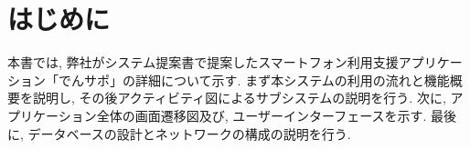 \section{はじめに}
本書では, 弊社がシステム提案書で提案したスマートフォン利用支援アプリケーション「でんサポ」の詳細について示す. まず本システムの利用の流れと機能概要を説明し, その後アクティビティ図によるサブシステムの説明を行う. 次に, アプリケーション全体の画面遷移図及び, ユーザーインターフェースを示す. 最後に, データベースの設計とネットワークの構成の説明を行う.